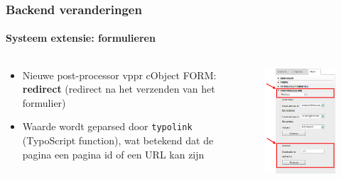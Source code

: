 \begin{frame}[fragile]
	\frametitle{Backend veranderingen}
	\framesubtitle{Systeem extensie: formulieren}

	\begin{columns}[T]

		\begin{column}{.5\textwidth}
			\begin{itemize}
				\item Nieuwe post-processor vppr cObject FORM: \textbf{redirect}\newline
					(redirect na het verzenden van het formulier)
				\item Waarde wordt geparsed door \texttt{typolink} (TypoScript function),\newline
					wat betekend dat de pagina een pagina id of een URL kan zijn
					\end{itemize}
		\end{column}

		\begin{column}{.5\textwidth}
			\begin{figure}\vspace*{-0.4cm}
				\includegraphics[width=0.65\linewidth]{Images/BackendChanges/FormRedirectPostProcessor.png}
			\end{figure}
		\end{column}

	\end{columns}

\end{frame}

